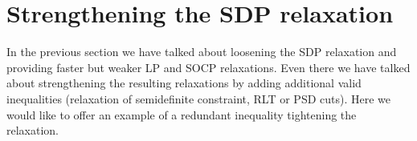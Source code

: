 \documentclass[12pt]{book}
\theoremstyle{definition}
\begin{document}
%	


\section{Strengthening the SDP relaxation}

In the previous section we have talked about loosening the SDP relaxation and providing faster but weaker LP and SOCP relaxations. Even there we have talked about strengthening the resulting relaxations by adding additional valid inequalities (relaxation of semidefinite constraint, RLT or PSD cuts). Here we would like to offer an example of a redundant inequality tightening the relaxation.
\end{document}
